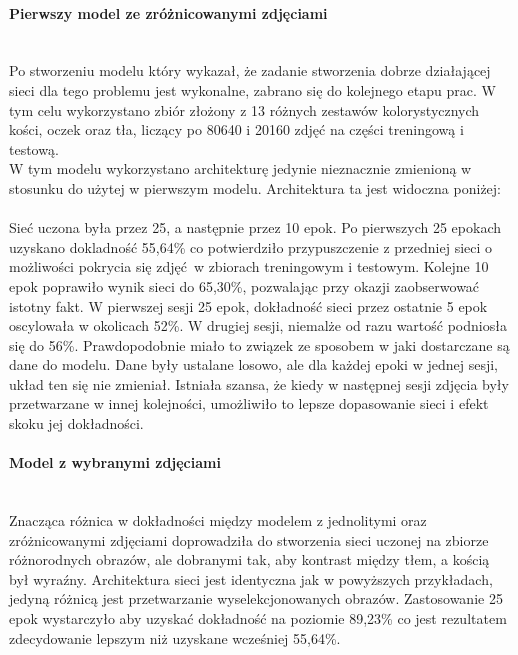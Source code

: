 \paragraph{Pierwszy model ze zróżnicowanymi zdjęciami} \mbox{}\\
Po stworzeniu modelu który wykazał, że zadanie stworzenia dobrze działającej sieci dla
tego problemu jest wykonalne, zabrano się do kolejnego etapu prac. W tym celu
wykorzystano zbiór złożony z 13 różnych zestawów kolorystycznych kości, oczek oraz tła,
liczący po 80640 i 20160 zdjęć na części treningową i testową.\\
W tym modelu wykorzystano architekturę jedynie nieznacznie zmienioną w stosunku do
użytej w pierwszym modelu. Architektura ta jest widoczna poniżej: \\\\
Sieć uczona była przez 25, a następnie przez 10 epok.
Po pierwszych 25 epokach uzyskano dokladność 55,64\% co potwierdziło przypuszczenie
z przedniej sieci o możliwości pokrycia się zdjęć w zbiorach treningowym i testowym.
Kolejne 10 epok poprawiło wynik sieci do 65,30\%, pozwalając przy okazji zaobserwować
istotny fakt. W pierwszej sesji 25 epok, dokładność sieci przez ostatnie
5 epok oscylowała w okolicach 52\%. W drugiej sesji, niemalże od razu wartość
podniosła się do 56\%. Prawdopodobnie miało to związek ze sposobem w jaki dostarczane
są dane do modelu. Dane były ustalane losowo, ale dla każdej epoki w jednej sesji,
układ ten się nie zmieniał. Istniała szansa, że kiedy w następnej sesji zdjęcia
były przetwarzane w innej kolejności, umożliwiło to lepsze dopasowanie sieci i efekt
skoku jej dokładności.

\paragraph{Model z wybranymi zdjęciami} \mbox{}\\
Znacząca różnica w dokładności między modelem z jednolitymi oraz zróżnicowanymi zdjęciami
doprowadziła do stworzenia sieci uczonej na zbiorze różnorodnych obrazów, ale
dobranymi tak, aby kontrast między tłem, a kością był wyraźny. Architektura sieci
jest identyczna jak w powyższych przykładach, jedyną różnicą jest przetwarzanie
wyselekcjonowanych obrazów. Zastosowanie 25 epok wystarczyło aby uzyskać dokładność
na poziomie 89,23\% co jest rezultatem zdecydowanie lepszym niż uzyskane wcześniej 55,64\%.

